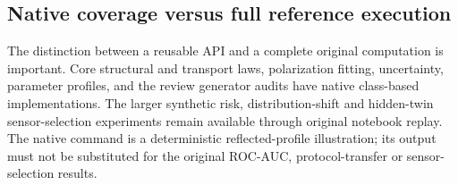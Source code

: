 \documentclass[11pt,a4paper]{article}
\newcommand{\code}[1]{\texttt{\detokenize{#1}}}
\begin{document}
\subsection{Native coverage versus full reference execution}

The distinction between a reusable API and a complete original computation is important. Core structural and transport laws, polarization fitting, uncertainty, parameter profiles, and the review generator audits have native class-based implementations. The larger synthetic risk, distribution-shift and hidden-twin sensor-selection experiments remain available through original notebook replay. The native \code{hidden_state} command is a deterministic reflected-profile illustration; its output must not be substituted for the original ROC-AUC, protocol-transfer or sensor-selection results.
\end{document}
